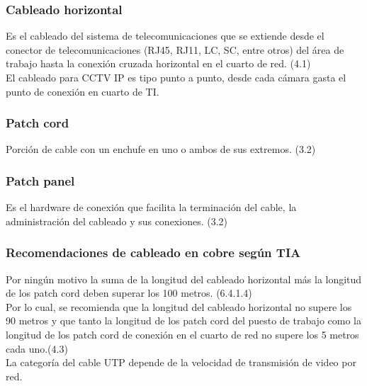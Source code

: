 \subsubsection{Cableado horizontal}

Es el cableado del sistema de telecomunicaciones que se extiende desde el conector de telecomunicaciones (RJ45, RJ11, LC, SC, entre otros) del área de trabajo hasta la conexión cruzada horizontal en el cuarto de red. (4.1) \cite{TIA}\\

El cableado para CCTV IP es tipo punto a punto, desde cada cámara gasta el punto de conexión en cuarto de TI.


\subsubsection{Patch cord}

Porción de cable con un enchufe en uno o ambos de sus extremos. (3.2) \cite{TIA}


\subsubsection{Patch panel}

Es el hardware de conexión que facilita la terminación del cable, la administración del cableado y sus conexiones. (3.2) \cite{TIA}



\subsubsection{Recomendaciones de cableado en cobre según TIA}

Por ningún motivo la suma de la longitud del cableado horizontal más la longitud de los patch cord deben superar los 100 metros. (6.4.1.4) \cite{TIA}\\

Por lo cual, se recomienda que la longitud del cableado horizontal no supere los 90 metros y que tanto la longitud de los patch cord del puesto de trabajo como la longitud de los patch cord de conexión en el cuarto de red no supere los 5 metros cada uno.(4.3) \cite{TIA}\\

La categoría del cable UTP depende de la velocidad de transmisión de video por red.





















